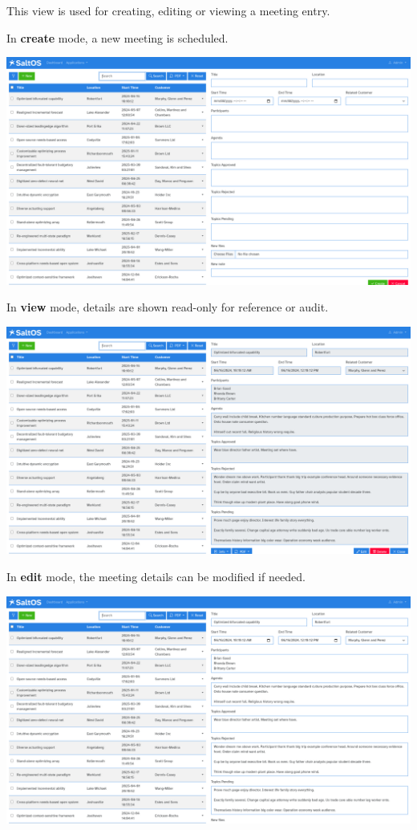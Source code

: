 \documentclass[a4paper]{article}
\begin{document}
This view is used for creating, editing or viewing a meeting entry.

In \textbf{create} mode, a new meeting is scheduled.

\begin{center}\includegraphics[width=1\textwidth]{../ujest/snaps/test-screenshots-js-screenshots-crm-meetings-create-en-us-1-snap.png}\end{center}

In \textbf{view} mode, details are shown read-only for reference or audit.

\begin{center}\includegraphics[width=1\textwidth]{../ujest/snaps/test-screenshots-js-screenshots-crm-meetings-view-100-en-us-1-snap.png}\end{center}

In \textbf{edit} mode, the meeting details can be modified if needed.

\begin{center}\includegraphics[width=1\textwidth]{../ujest/snaps/test-screenshots-js-screenshots-crm-meetings-edit-100-en-us-1-snap.png}\end{center}
\end{document}
